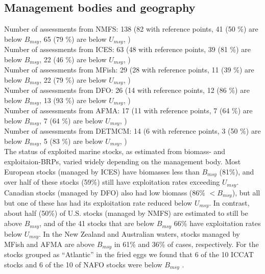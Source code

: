 \subsection*{Management bodies and geography}
\noindent
Number of assessments from NMFS: 138 (82 with reference points, 41 (50 \%) are below $B_{msy}$, 65 (79 \%) are below $U_{msy}$, ) \\
Number of assessments from ICES: 63 (48 with reference points, 39 (81 \%) are below $B_{msy}$, 22 (46 \%) are below $U_{msy}$, ) \\
Number of assessments from MFish: 29 (28 with reference points, 11 (39 \%) are below $B_{msy}$, 22 (79 \%) are below $U_{msy}$, ) \\
Number of assessments from DFO: 26 (14 with reference points, 12 (86 \%) are below $B_{msy}$, 13 (93 \%) are below $U_{msy}$, ) \\
Number of assessments from AFMA: 17 (11 with reference points, 7 (64 \%) are below $B_{msy}$, 7 (64 \%) are below $U_{msy}$, ) \\
Number of assessments from DETMCM: 14 (6 with reference points, 3 (50 \%) are below $B_{msy}$, 5 (83 \%) are below $U_{msy}$, ) \\

The status of exploited marine stocks, as estimated from biomass- and
exploitaion-BRPs, varied widely depending on the management body. Most European stocks (managed by
ICES) have biomasses less than $B_{msy}$
(81\%), and over half of these
stocks (59\%) still
have exploitation rates exceeding $U_{msy}$. Canadian stocks (managed
by DFO) also had low biomass (86\%
$< B_{msy}$), but all but one of these has had its exploitation rate
reduced below $U_{msy}$. In contrast, about half
(50\%) of U.S. stocks (managed by
NMFS) are estimated to still be above $B_{msy}$, and of the
41 stocks that are below $B_{msy}$
66\% have exploitation
rates below $U_{msy}$. In the New
Zealand and Australian waters, stocks managed by MFish and AFMA are
above $B_{msy}$ in 61\% and
36\% of cases, respectively. For
the stocks grouped as ``Atlantic'' in the fried eggs we
found that 6 of the
10 ICCAT stocks and
6 of the
10 of NAFO stocks were below $B_{msy}$ .



